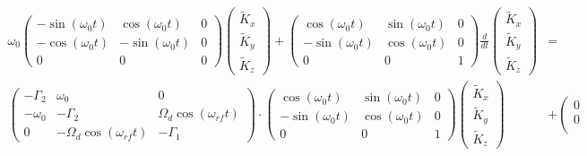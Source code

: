\documentclass{article}
\begin{document}
\begin{align}
    \omega_{0}\left(\begin{array}{ccc}
        -\sin(\omega_{0}t) & \cos(\omega_{0}t) & 0\\
        -\cos(\omega_{0}t) & -\sin(\omega_{0}t) & 0\\
        0 & 0 & 0
    \end{array}\right)
    \left(\begin{array}{c}
        \tilde{K}_{x}\\
        \tilde{K}_{y}\\
        \tilde{K}_{z}
    \end{array}\right) + 
    \left(\begin{array}{ccc}
        \cos(\omega_{0}t) & \sin(\omega_{0}t) & 0\\
        -\sin(\omega_{0}t) & \cos(\omega_{0}t) & 0\\
        0 & 0 & 1
    \end{array}\right)
    \frac{d}{dt}\left(\begin{array}{c}
        \tilde{K}_{x}\\
        \tilde{K}_{y}\\
        \tilde{K}_{z}
    \end{array}\right)
    &=\\ 
    \left(\begin{matrix}
    -\Gamma_2               &  \omega_0                        &  0                              \\
    -\omega_0               &  -\Gamma_2                       &  \Omega_d \cos{(\omega_{rf} t)} \\
    0                       &  -\Omega_d \cos{(\omega_{rf} t)} &  -\Gamma_1 
    \end{matrix}\right)\cdot
    \left(\begin{array}{ccc}
        \cos(\omega_{0}t) & \sin(\omega_{0}t) & 0\\
        -\sin(\omega_{0}t) & \cos(\omega_{0}t) & 0\\
        0 & 0 & 1
    \end{array}\right)
    \left(\begin{array}{c}
        \tilde{K}_{x}\\
        \tilde{K}_{y}\\
        \tilde{K}_{z}
    \end{array}\right) &+ 
    \left(\begin{matrix}
         0  \\
         0  \\

\end{matrix}
\end{align}
\end{document}
